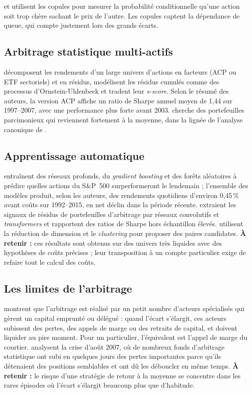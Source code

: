 \documentclass[11pt,a4paper]{article}
\begin{document}
\citet{liewwu2013} et \citet{xie2016} utilisent les copules pour mesurer la probabilité conditionnelle qu'une action soit \og trop chère\fg{} sachant le prix de l'autre. Les copules captent la dépendance de queue, qui compte justement lors des grands écarts.

\subsection{Arbitrage statistique multi-actifs}

\citet{avellaneda2010} décomposent les rendements d'un large univers d'actions en facteurs (ACP ou ETF sectoriels) et en résidus, modélisent les résidus cumulés comme des processus d'Ornstein-Uhlenbeck et tradent leur \emph{s-score}. Selon le résumé des auteurs, la version ACP affiche un ratio de Sharpe annuel moyen de 1,44 sur 1997–2007, avec une performance plus forte avant 2003. \citet{daspremont2011} cherche des portefeuilles parcimonieux qui reviennent fortement à la moyenne, dans la lignée de l'analyse canonique de \citet{boxtiao1977}.

\subsection{Apprentissage automatique}

\citet{krauss2017ml} entraînent des réseaux profonds, du \emph{gradient boosting} et des forêts aléatoires à prédire quelles actions du S\&P~500 surperformeront le lendemain ; l'ensemble des modèles produit, selon les auteurs, des rendements quotidiens d'environ 0,45\,\% avant coûts sur 1992–2015, en net déclin dans la période récente. \citet{guijarro2021} extraient les signaux de résidus de portefeuilles d'arbitrage par réseaux convolutifs et \emph{transformers} et rapportent des ratios de Sharpe hors échantillon élevés. \citet{sarmento2020} utilisent la réduction de dimension et le \emph{clustering} pour proposer des paires candidates. \textbf{À retenir :} ces résultats sont obtenus sur des univers très liquides avec des hypothèses de coûts précises ; leur transposition à un compte particulier exige de refaire tout le calcul des coûts.

\subsection{Les limites de l'arbitrage}

\citet{shleifer1997} montrent que l'arbitrage est réalisé par un petit nombre d'acteurs spécialisés qui gèrent un capital emprunté ou délégué : quand l'écart s'élargit, ces acteurs subissent des pertes, des appels de marge ou des retraits de capital, et doivent liquider au pire moment. Pour un particulier, l'équivalent est l'appel de marge du courtier. \citet{khandanilo2011} analysent la crise d'août 2007, où de nombreux fonds d'arbitrage statistique ont subi en quelques jours des pertes importantes parce qu'ils détenaient des positions semblables et ont dû les déboucler en même temps. \textbf{À retenir :} le risque d'une stratégie de retour à la moyenne se concentre dans les rares épisodes où l'écart s'élargit beaucoup plus que d'habitude.
\end{document}
